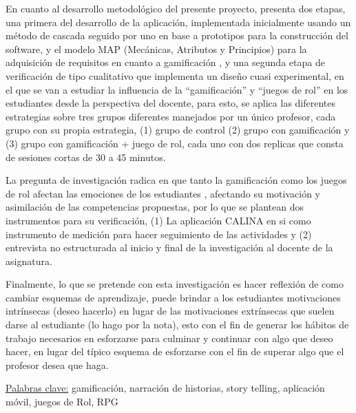 \begin{singlespace}
En cuanto al desarrollo metodológico del presente proyecto, presenta dos etapas, una primera del desarrollo de 
la aplicación, implementada inicialmente usando un método de cascada seguido por uno en base a prototipos para 
la construcción del software, y el modelo MAP (Mecánicas, Atributos y Principios) para la adquisición de 
requisitos en cuanto a gamificación \cite{CECHELLA2018}, y una segunda etapa de verificación de tipo 
cualitativo que implementa un diseño cuasi experimental, en el que se van a estudiar la influencia de la 
``gamificación'' y ``juegos de rol'' en los estudiantes desde la perspectiva del docente, para esto, se aplica 
las diferentes estrategias sobre tres grupos diferentes manejados por un único profesor, cada grupo con su 
propia estrategia, (1) grupo de control (2) grupo con gamificación y (3) grupo con gamificación + juego de rol, 
cada uno con dos replicas que consta de sesiones cortas de 30 a 45 minutos. 

La pregunta de investigación radica en que tanto la gamificación como los juegos de rol afectan las emociones 
de los estudiantes \cite{MULLINS2020304}, afectando su motivación y asimilación de las competencias 
propuestas, por lo que se plantean dos instrumentos para su verificación, (1) La aplicación CALINA en si como 
instrumento de medición para hacer seguimiento de las actividades y (2) entrevista no estructurada
al inicio y final de la investigación al docente de la asignatura. 

Finalmente, lo que se pretende con esta investigación es hacer reflexión de como cambiar esquemas de 
aprendizaje, puede brindar a los estudiantes motivaciones intrínsecas (deseo hacerlo) en lugar de las 
motivaciones extrínsecas que suelen darse al estudiante (lo hago por la nota), esto con el fin de generar los 
hábitos de trabajo necesarios en esforzarse para culminar y continuar con algo que deseo hacer, en lugar del 
típico esquema de esforzarse con el fin de superar algo que el profesor desea que haga.
\end{singlespace}

\uline{Palabras clave:} gamificación, narración de historias, story telling, aplicación móvil, juegos de Rol, RPG




